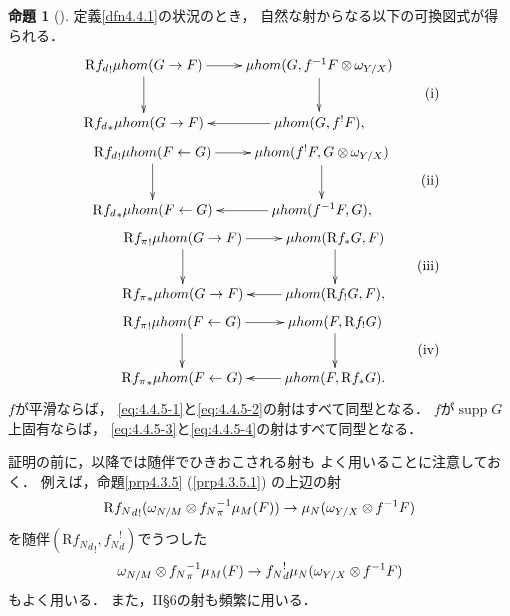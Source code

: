 \documentclass[leqno, 10pt, a4paper, dvipdfmx]{jsarticle}
\theoremstyle{definition}
\numberwithin{equation}{section}
\newcommand{\supp}{\mathop{\mathrm{supp}}\nolimits}
\newcommand{\Rder}{\mathrm{R}}
\newcommand{\tens}[1][]{\mathbin{\otimes_{\raise1.5ex\hbox to-.1em{}{#1}}}}
\theoremstyle{mystyle}
\newtheorem{PRP}[AXM]{命題}
\renewenvironment{leftbar}{%
  \def\FrameCommand{\textcolor{lightgray}{\vrule width 4pt} \hspace{10pt}}%
  \MakeFramed {\advance\hsize-\width \FrameRestore}}%
{\endMakeFramed}
\newcommand{\mpb}[1][]{{#1}_{\pi}} %
\newcommand{\mdiff}[1][]{{#1}_{d}} %
\newcommand{\muhom}{\mu hom}
\begin{document}
\begin{leftbar}
\begin{PRP}[{\cite[Prop.4.4.5]{KS90}}]\label{prp.4.4.5}
  定義\ref{dfn4.4.1}の状況のとき，
  自然な射からなる以下の可換図式が得られる．
  \begin{align}
    \vcenter{\xymatrix{
      \Rder{{\mdiff[f]}_{!}}\muhom(G\to F)
      \ar[r]
      \ar[d]
      &
      \muhom(G,f^{-1}F\tens[]\omega_{Y/X})
      \ar[d]
      \\
      \Rder{{\mdiff[f]}_{\ast}}\muhom(G\to F)
      &
      \muhom(G,f^{!}F),
      \ar[l]
    }}\tag{i}\label{eq:4.4.5-1}\\
    \vcenter{\xymatrix{
      \Rder{{\mdiff[f]}_{!}}\muhom(F\leftarrow G)
      \ar[r]
      \ar[d]
      &
      \muhom(f^{!}F,G\tens[]\omega_{Y/X})
      \ar[d]
      \\
      \Rder{{\mdiff[f]}_{\ast}}\muhom(F\leftarrow G)
      &
      \muhom(f^{-1}F,G),
      \ar[l]
    }}\tag{ii}\label{eq:4.4.5-2}\\
    \vcenter{\xymatrix{
      \Rder{{\mpb[f]}_{!}}\muhom(G\to F)
      \ar[r]
      \ar[d]
      &
      \muhom(\Rder{f_{\ast}}G,F)
      \ar[d]
      \\
      \Rder{{\mpb[f]}_{\ast}}\muhom(G\to F)
      &
      \muhom(\Rder{f_{!}}G,F),
      \ar[l]
    }}\tag{iii}\label{eq:4.4.5-3}\\
    \vcenter{\xymatrix{
      \Rder{{\mpb[f]}_{!}}\muhom(F\leftarrow G)
      \ar[r]
      \ar[d]
      &
      \muhom(F,\Rder{f_{!}}G)
      \ar[d]
      \\
      \Rder{{\mpb[f]}_{\ast}}\muhom(F\leftarrow G)
      &
      \muhom(F,\Rder{f_{\ast}}G).
      \ar[l]
    }}\tag{iv}\label{eq:4.4.5-4}
  \end{align}
  \(f\)が平滑ならば，
  \eqref{eq:4.4.5-1}と\eqref{eq:4.4.5-2}の射はすべて同型となる．
  \(f\)が\(\supp{G}\)上固有ならば，
  \eqref{eq:4.4.5-3}と\eqref{eq:4.4.5-4}の射はすべて同型となる．
\end{PRP}
\end{leftbar}    

証明の前に，以降では随伴でひきおこされる射も
よく用いることに注意しておく．
例えば，命題\ref{prp4.3.5} (\ref{prp4.3.5.1}) の上辺の射
\[
  \Rder{{\mdiff[f_N]}_{!}}(
    \omega_{N/M}\tens[]{\mpb[f_N]^{-1}}\mu_{M}(F)
  )
  \to
  \mu_{N}(\omega_{Y/X}\tens[]{f^{-1}}F)     
\]
を随伴\((\Rder{{\mdiff[f_N]}_{!}},\mdiff[f_N]^{!})\)でうつした
\[
  \omega_{N/M}\tens[]{\mpb[f_N]^{-1}}\mu_{M}(F)
  \to
  \mdiff[f_N]^{!}\mu_{N}(\omega_{Y/X}\tens[]{f^{-1}}F)
\]
もよく用いる．
また，II\S6の射も頻繁に用いる．
\end{document}
